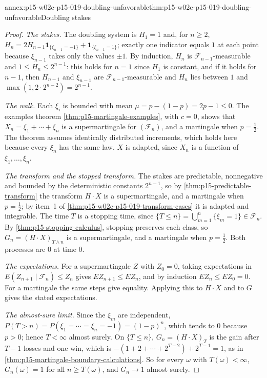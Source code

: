 \begin{annexitem}{annex:p15-w02c-p15-019-doubling-unfavorable}{thm:p15-w02c-p15-019-doubling-unfavorable}{Doubling stakes}
\begin{proof}
\emph{The stakes.} The doubling system is \(H_1=1\) and, for
\(n\geq2\),
\(H_n=2H_{n-1}\mathbf1_{\{\xi_{n-1}=-1\}}+\mathbf1_{\{\xi_{n-1}=1\}}\);
exactly one indicator equals \(1\) at each point because \(\xi_{n-1}\)
takes only the values \(\pm1\). By induction, \(H_n\) is
\(\mathcal F_{n-1}\)-measurable and \(1\leq H_n\leq2^{n-1}\): this holds
for \(n=1\) since \(H_1\) is constant, and if it holds for \(n-1\), then
\(H_{n-1}\) and \(\xi_{n-1}\) are \(\mathcal F_{n-1}\)-measurable and
\(H_n\) lies between \(1\) and \(\max(1,2\cdot2^{n-2})=2^{n-1}\).

\emph{The walk.} Each \(\xi_i\) is bounded with mean
\(\mu=p-(1-p)=2p-1\leq0\). The examples theorem
\cref{thm:p15-martingale-examples}, with \(c=0\), shows that
\(X_n=\xi_1+\cdots+\xi_n\) is a supermartingale for
\((\mathcal F_n)\), and a martingale when \(p=\tfrac12\). The theorem
assumes identically distributed increments, which holds here because
every \(\xi_n\) has the same law. \(X\) is adapted, since \(X_n\) is a
function of \(\xi_1,\ldots,\xi_n\).

\emph{The transform and the stopped transform.} The stakes are
predictable, nonnegative and bounded by the deterministic constants
\(2^{n-1}\), so by \cref{thm:p15-predictable-transform} the transform
\(H\cdot X\) is a supermartingale, and a martingale when
\(p=\tfrac12\); by item~1 of \cref{thm:p15-w02c-p15-019-transform-cases}
it is adapted and integrable. The time \(T\) is a stopping time, since
\(\{T\leq n\}=\bigcup_{m=1}^n\{\xi_m=1\}\in\mathcal F_n\). By
\cref{thm:p15-stopping-calculus}, stopping preserves each class, so
\(G_n=(H\cdot X)_{T\wedge n}\) is a supermartingale, and a martingale
when \(p=\tfrac12\). Both processes are \(0\) at time \(0\).

\emph{The expectations.} For a supermartingale \(Z\) with \(Z_0=0\),
taking expectations in \(E(Z_{n+1}\mid\mathcal F_n)\leq Z_n\) gives
\(EZ_{n+1}\leq EZ_n\), and by induction \(EZ_n\leq EZ_0=0\). For a
martingale the same steps give equality. Applying this to \(H\cdot X\)
and to \(G\) gives the stated expectations.

\emph{The almost-sure limit.} Since the \(\xi_m\) are independent,
\(P(T>n)=P(\xi_1=\cdots=\xi_n=-1)=(1-p)^n\), which tends to \(0\)
because \(p>0\); hence \(T<\infty\) almost surely. On \(\{T\leq n\}\),
\(G_n=(H\cdot X)_T\) is the gain after \(T-1\) losses and one win, which
is \(-(1+2+\cdots+2^{T-2})+2^{T-1}=1\), as in
\cref{thm:p15-martingale-boundary-calculations}. So for every \(\omega\)
with \(T(\omega)<\infty\), \(G_n(\omega)=1\) for all
\(n\geq T(\omega)\), and \(G_n\to1\) almost surely.
\end{proof}
\end{annexitem}

